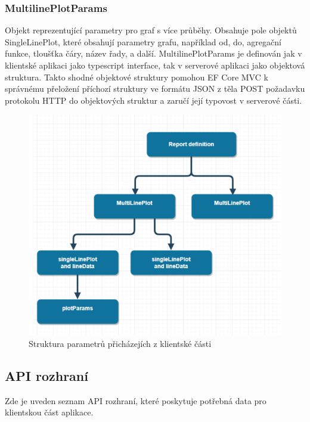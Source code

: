 \documentclass[FM,BP]{tulthesis}
\begin{document}
            \subsubsection{MultilinePlotParams}
                Objekt reprezentující parametry pro graf s více průběhy. 
                Obsahuje pole objektů SingleLinePlot, které obsahují parametry grafu, například od, do, agregační funkce, tloušťka čáry, název řady, a další.
                MultilinePlotParams je definován jak v klientské aplikaci jako typescript interface, tak v serverové aplikaci jako objektová struktura.
                Takto shodné objektové struktury pomohou EF Core MVC k správnému přeložení příchozí struktury ve formátu JSON 
                z těla POST požadavku protokolu HTTP do objektových struktur a zaručí její typovost v serverové části. 
                \begin{figure}[h]
                    \centering
                    \includegraphics[scale=0.75]{pic/reportDefinitionStructure.png}
                    \caption{Struktura parametrů přicházejích z klientské části} \label{Obrázek č. 1}
                \end{figure}

    \subsection{API rozhraní}
        Zde je uveden seznam API rozhraní, které poskytuje potřebná data pro klientskou část aplikace. 
\end{document}
